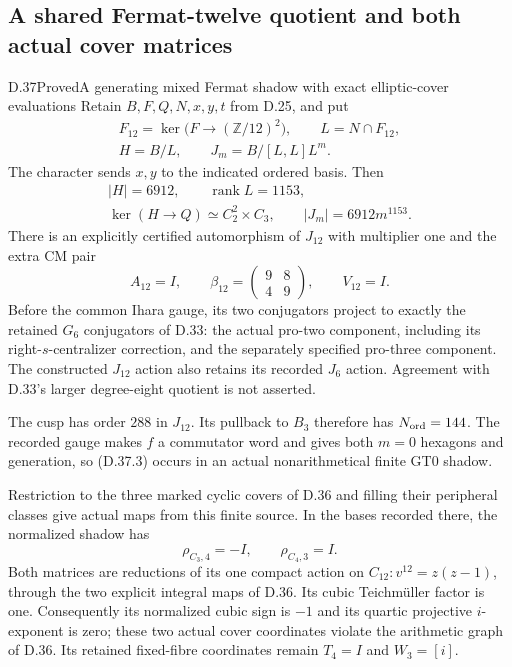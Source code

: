 \subsection{A shared Fermat-twelve quotient and both actual cover matrices}

\begin{statement}{D.37}{Proved}{A generating mixed Fermat shadow with exact elliptic-cover evaluations}
Retain $B,F,Q,N,x,y,t$ from D.25, and put
\[
 \begin{gathered}
 F_{12}=\ker\bigl(F\longrightarrow(\mathbb Z/12)^2\bigr),
 \qquad L=N\cap F_{12},\\
 H=B/L,\qquad J_m=B/[L,L]L^m .
 \end{gathered}                                           \tag{D.37.1}
\]
The character sends $x,y$ to the indicated ordered basis. Then
\[
 \begin{gathered}
 |H|=6912,\qquad \operatorname{rank}L=1153,\\
 \ker(H\to Q)\simeq C_2^2\times C_3,\qquad
 |J_m|=6912m^{1153}.
 \end{gathered}                                           \tag{D.37.2}
\]
There is an explicitly certified automorphism of $J_{12}$ with
multiplier one and the extra CM pair
\[
 A_{12}=I,\qquad
 \beta_{12}=\begin{pmatrix}9&8\\4&9\end{pmatrix},\qquad
 V_{12}=I.                                               \tag{D.37.3}
\]
Before the common Ihara gauge, its two conjugators project to
exactly the retained $G_6$ conjugators of D.33: the actual
pro-two component, including its right-$s$-centralizer correction,
and the separately specified pro-three component. The constructed
$J_{12}$ action also retains its recorded $J_6$ action. Agreement
with D.33's larger degree-eight quotient is not asserted.

The cusp has order $288$ in $J_{12}$. Its pullback to $B_3$
therefore has $N_{\rm ord}=144$. The recorded gauge makes $f$ a
commutator word and gives both $m=0$ hexagons and generation,
so (D.37.3) occurs in an actual nonarithmetical finite GT0 shadow.

Restriction to the three marked cyclic covers of D.36 and
filling their peripheral classes give actual maps from this
finite source. In the bases recorded there, the normalized
shadow has
\[
 \rho_{C_3,4}=-I,\qquad \rho_{C_4,3}=I.                  \tag{D.37.4}
\]
Both matrices are reductions of its one compact action on
$C_{12}:v^{12}=z(z-1)$, through the two explicit integral maps
of D.36. Its cubic Teichm\"uller factor is one. Consequently
its normalized cubic sign is $-1$ and its quartic projective
$i$-exponent is zero; these two actual cover coordinates violate
the arithmetic graph of D.36. Its retained fixed-fibre
coordinates remain $T_4=I$ and $W_3=[i]$.


\end{statement}
